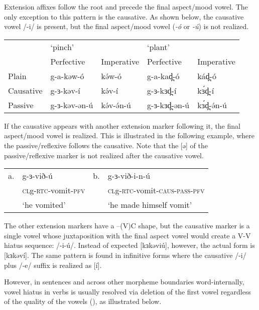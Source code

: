 Extension affixes follow the root and precede the final aspect/mood vowel. The only exception to this pattern is the causative. As shown below, the causative vowel /-i/ is present, but the final aspect/mood vowel (\textit{-ó} or \textit{-ú}) is not realized.

\ea
\begin{tabular}[t]{lllll}
& 	         	‘pinch’		&			&	‘plant’\\
&		Perfective	& Imperative			&	Perfective&	Imperative\\
Plain		&	g-a-kəw-ó	&	kə́w-ó	&	g-a-kad̪-ó	&	kád̪-ó\\
Causative  	&   g-ɜ-kəv-í	&	kə́v-í	&	g-ɜ-kɜd̪-í	&	kɜ́d̪-í\\
Passive		&	g-ɜ-kəv-ən-ú&	kə́v-ə́n-ú	&	g-ɜ-kɜd̪-ən-ú& 	kɜ́d̪-ə́n-ú\\
\end{tabular}
\z 

If the causative appears with another extension marker following it, the final aspect/mood vowel is realized. This is illustrated in the following example, where the passive/reflexive follows the causative. Note that the [ə] of the passive/reflexive marker is not realized after the causative vowel. 
\ea
\begin{tabular}[t]{llll}
a.&	g-ɜ-við-ú			&	b.	&	g-ɜ-við-i-n-ú\\
&	\textsc{cl}g-\textsc{rtc}-vomit-\textsc{pfv}	&		&	\textsc{cl}g-\textsc{rtc}-vomit-\textsc{caus-pass-\textsc{pfv}}\\
&	‘he vomited’		&		&	‘he made himself vomit’\\
\end{tabular}
\z 					
The other extension markers have a –(V)C shape, but the causative marker is a single vowel whose juxtaposition with the final aspect vowel would create a V-V hiatus sequence: /-i-ú/. Instead of expected [kɜkəviú], however, the actual form is [kɜkəví]. The same pattern is found in infinitive forms where the causative /-i/ plus /-e/ suffix is realized as [í].

However, in sentences and across other morpheme boundaries word-internally, vowel hiatus in verbs is usually resolved via deletion of the first vowel regardless of the quality of the vowels (), as illustrated below. 

